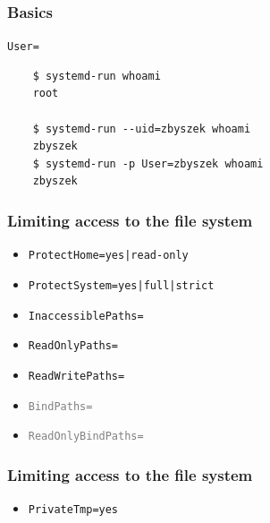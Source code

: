 \documentclass[serif]{beamer}
\begin{document}
\begin{frame}[fragile]
  \frametitle{Basics}
  \pause
  \texttt{User=}

  \medskip
  \pause

  \begin{verbatim}
    $ systemd-run whoami
    root

    $ systemd-run --uid=zbyszek whoami
    zbyszek
    $ systemd-run -p User=zbyszek whoami
    zbyszek
  \end{verbatim}
\end{frame}

\begin{frame}
  \frametitle{Limiting access to the file system}
  \begin{itemize}
  \item \texttt{ProtectHome=yes|read-only}
  \item \texttt{ProtectSystem=yes|full|strict}
    \pause

  \item \texttt{InaccessiblePaths=}
  \item \texttt{ReadOnlyPaths=}
  \item \texttt{ReadWritePaths=}

    \pause
  \item \texttt{\textcolor{gray}{BindPaths=}}
  \item \texttt{\textcolor{gray}{ReadOnlyBindPaths=}}

  \end{itemize}
\end{frame}

\begin{frame}
  \frametitle{Limiting access to the file system}

  \begin{itemize}
  \item \texttt{PrivateTmp=yes}
  \end{itemize}
\end{frame}
\end{document}
